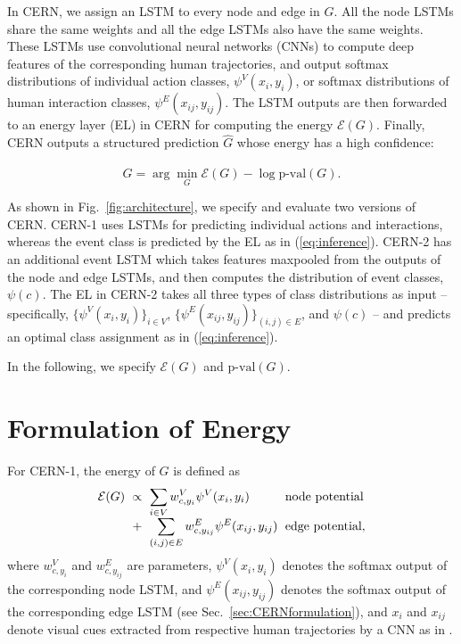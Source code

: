 \documentclass[10pt,twocolumn,letterpaper]{article}
\begin{document}
In CERN, we assign an LSTM to every node and edge in $G$. All the node LSTMs share the same weights and all the edge LSTMs also have the same weights. These LSTMs use convolutional neural networks (CNNs) to compute deep features of the corresponding human trajectories, and output softmax distributions of individual action classes, $\psi^V(x_i, y_i)$, or softmax distributions of human interaction classes, $\psi^E(x_{ij}, y_{ij})$. The LSTM outputs are then forwarded to an energy layer (EL) in CERN for computing the energy $\mathcal{E}(G)$. Finally, CERN outputs a structured prediction $\hat{G}$ whose energy has a high confidence:

\begin{equation} 
\hat{G} = \arg\min_G \mathcal{E}(G) - \log \text{p-val}(G).
\label{eq:inference}
\end{equation}

As shown in Fig.~\ref{fig:architecture}, we specify and evaluate two versions of CERN. CERN-1 uses LSTMs for predicting individual actions and interactions, whereas the event class is predicted by the EL as in (\ref{eq:inference}). CERN-2 has an additional event LSTM which takes features maxpooled from the outputs of the node and edge LSTMs, and then computes the distribution of event classes, $\psi(c)$. The EL in CERN-2 takes all three types of class distributions as input -- specifically,  $\{\psi^V(x_i,y_i)\}_{i \in V}$, $\{\psi^E(x_{ij}, y_{ij})\}_{(i,j)\in E}$, and $\psi(c)$ -- and predicts an optimal class assignment as in (\ref{eq:inference}).

In the following, we specify $\mathcal{E}(G)$ and $\text{p-val}(G)$.

\section{Formulation of Energy } \label{sec:energy}

For CERN-1, the energy of $G$ is defined as
\begin{equation}
\setlength{\arraycolsep}{3pt}
\begin{array}{llll}
 \mathcal{E}(G) &\propto& \displaystyle \sum_{i 
\in V}  w^V_{c,y_i}\psi^V(x_i,y_i)  & \text{node potential}\\
 &+& \displaystyle \sum_{(i,j) \in E} w^E_{c,y_{ij}} \psi^E(x_{ij},y_{ij})  & \text{edge potential},
\end{array}
\label{eq:energy0}
\end{equation}
where $w^V_{c,y_i}$ and $w^E_{c,y_{ij}}$ are parameters,  $\psi^V(x_i,y_i)$ denotes the softmax output of the corresponding node LSTM, and $\psi^E(x_{ij},y_{ij})$ denotes  the softmax output of the corresponding edge LSTM (see Sec.~\ref{sec:CERNformulation}), and $x_i$ and $x_{ij}$ denote
visual cues extracted from respective human trajectories by a CNN as in \cite{Deng2016,Ibrahim2016}.
\end{document}
